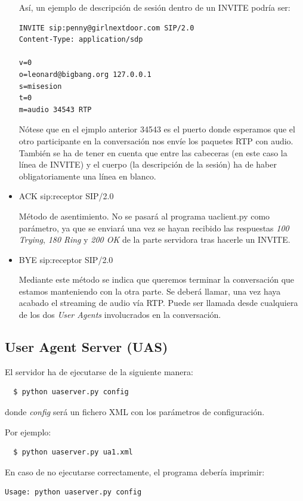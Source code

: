 \documentclass[a4paper,11pt]{article}
\begin{document}
\begin{itemize}
Así, un ejemplo de descripción de sesión dentro de un INVITE podría ser:

\begin{verbatim}
INVITE sip:penny@girlnextdoor.com SIP/2.0
Content-Type: application/sdp

v=0
o=leonard@bigbang.org 127.0.0.1
s=misesion
t=0
m=audio 34543 RTP
\end{verbatim}

Nótese que en el ejmplo anterior 34543 es el puerto donde esperamos que el otro participante en la conversación nos envíe los paquetes RTP con audio. También se ha de tener en cuenta que entre las cabeceras (en este caso la línea de INVITE) y el cuerpo (la descripción de la sesión) ha de haber obligatoriamente una línea en blanco.

    \item ACK sip:receptor SIP/2.0

    Método de asentimiento. No se pasará al programa uaclient.py como parámetro, ya que se enviará una vez se hayan recibido las respuestas \emph{100 Trying}, \emph{180 Ring} y \emph{200 OK} de la parte servidora tras hacerle un INVITE.

    \item BYE sip:receptor SIP/2.0

    Mediante este método se indica que queremos terminar la conversación que estamos manteniendo con la otra parte. Se deberá llamar, una vez haya acabado el streaming de audio vía RTP. Puede ser llamada desde cualquiera de los dos \emph{User Agents} involucrados en la conversación.

  \end{itemize}


\subsection{User Agent Server (UAS)}

El servidor ha de ejecutarse de la siguiente manera:
\begin{verbatim}
  $ python uaserver.py config
\end{verbatim}

donde \emph{config} será un fichero XML con los parámetros de configuración.

Por ejemplo:
\begin{verbatim}
  $ python uaserver.py ua1.xml
\end{verbatim}

En caso de no ejecutarse correctamente, el programa debería imprimir:
\begin{verbatim}
Usage: python uaserver.py config
\end{verbatim}
\end{document}
